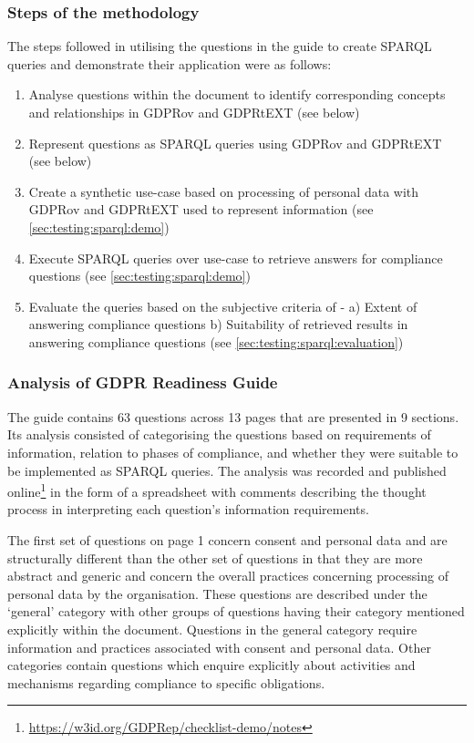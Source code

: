 \subsubsection{Steps of the methodology}
The steps followed in utilising the questions in the guide to create SPARQL queries and demonstrate their application were as follows:
\begin{enumerate}
    \item Analyse questions within the document to identify corresponding concepts and relationships in GDPRov and GDPRtEXT (see below)
    \item Represent questions as SPARQL queries using GDPRov and GDPRtEXT (see below)
    \item Create a synthetic use-case based on processing of personal data with GDPRov and GDPRtEXT used to represent information (see \autoref{sec:testing:sparql:demo})
    \item Execute SPARQL queries over use-case to retrieve answers for compliance questions (see \autoref{sec:testing:sparql:demo})
    \item Evaluate the queries based on the subjective criteria of - a) Extent of answering compliance questions b) Suitability of retrieved results in answering compliance questions (see \autoref{sec:testing:sparql:evaluation})
\end{enumerate}

\subsubsection{Analysis of GDPR Readiness Guide}
The guide contains 63 questions across 13 pages that are presented in 9 sections.
Its analysis consisted of categorising the questions based on requirements of information, relation to phases of compliance, and whether they were suitable to be implemented as SPARQL queries.
The analysis was recorded and published online\footnote{\url{https://w3id.org/GDPRep/checklist-demo/notes}} in the form of a spreadsheet with comments describing the thought process in interpreting each question's information requirements.

The first set of questions on page 1 concern consent and personal data and are structurally different than the other set of questions in that they are more abstract and generic and concern the overall practices concerning processing of personal data by the organisation.
These questions are described under the `general' category with other groups of questions having their category mentioned explicitly within the document.
Questions in the general category require information and practices associated with consent and personal data. Other categories contain questions which enquire explicitly about activities and mechanisms regarding compliance to specific obligations.

